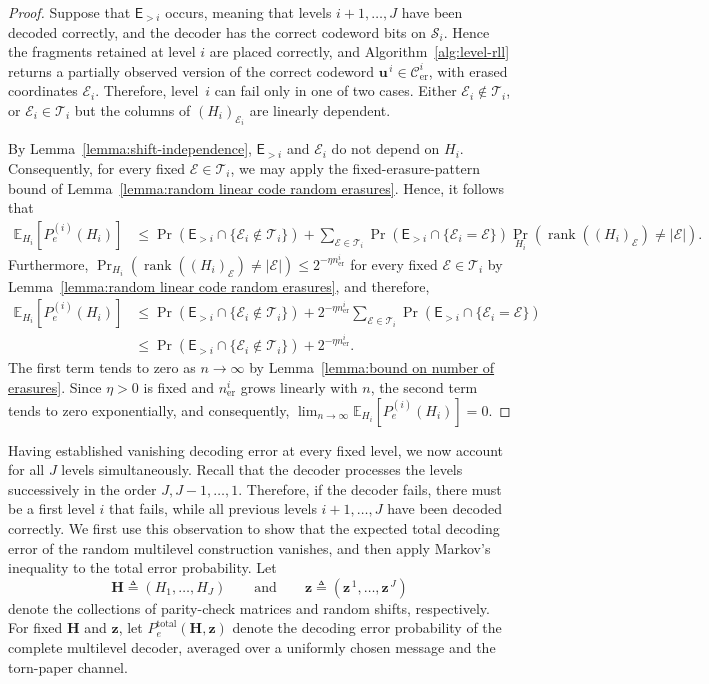 \documentclass[journal,letterpaper,onecolumn,11pt]{IEEEtran}
\newcommand{\cC}{\mathcal{C}}
\newcommand{\cE}{\mathcal{E}}
\newcommand{\cS}{\mathcal{S}}
\newcommand{\cT}{\mathcal{T}}
\newcommand{\boldu}{\mathbf{u}}
\newcommand{\boldz}{\mathbf{z}}
\newcommand{\boldH}{\mathbf{H}}
\newcommand{\rank}{\operatorname{rank}}
\begin{document}
\begin{proof}
Suppose that \(\mathsf E_{>i}\) occurs, meaning that levels
\(i+1,\ldots,J\) have been decoded correctly, and the decoder has the
correct codeword bits on \(\cS_i\). Hence the fragments retained at
level \(i\) are placed correctly, and
Algorithm~\ref{alg:level-rll} returns a partially observed version of the
correct codeword \(\boldu^{\,i}\in\cC_{\mathrm{er}}^i\), with erased
coordinates \(\cE_i\).
Therefore, level~\(i\) can fail only in one of two cases. Either
\(\cE_i\notin\cT_i\), or \(\cE_i\in\cT_i\) but the columns of
\((H_i)_{\cE_i}\) are linearly dependent.

By Lemma~\ref{lemma:shift-independence}, \(\mathsf E_{>i}\) and \(\cE_i\) do not depend on \(H_i\).
Consequently, for every fixed \(\cE\in\cT_i\), we may apply the fixed-erasure-pattern bound of
Lemma~\ref{lemma:random linear code random erasures}.
Hence, it follows that
\[
\begin{aligned}
\mathbb E_{H_i}\!\left[P_e^{(i)}(H_i)\right]
&\leq
\Pr\left(
\mathsf E_{>i}
\cap
\{\cE_i\notin\cT_i\}
\right)+
\sum_{\cE\in\cT_i}
\Pr\left(
\mathsf E_{>i}
\cap
\{\cE_i=\cE\}
\right)
\Pr_{H_i}\left(
\rank((H_i)_{\cE})\neq|\cE|
\right).
\end{aligned}
\]
Furthermore, $\Pr_{H_i}\left(
\rank((H_i)_{\cE})\neq|\cE|
\right)
\leq
2^{-\eta n_{\mathrm{er}}^i}$ for every fixed \(\cE\in\cT_i\) by Lemma~\ref{lemma:random linear code random erasures}, and therefore,
\[
\begin{aligned}
\mathbb E_{H_i}\!\left[P_e^{(i)}(H_i)\right]
&\leq
\Pr\left(
\mathsf E_{>i}
\cap
\{\cE_i\notin\cT_i\}
\right)+
2^{-\eta n_{\mathrm{er}}^i}
\sum_{\cE\in\cT_i}
\Pr\left(
\mathsf E_{>i}
\cap
\{\cE_i=\cE\}
\right)\\
&\leq
\Pr\left(
\mathsf E_{>i}
\cap
\{\cE_i\notin\cT_i\}
\right)
+
2^{-\eta n_{\mathrm{er}}^i}.
\end{aligned}
\]
The first term tends to zero as $n\to\infty$ by Lemma~\ref{lemma:bound on number of erasures}. Since \(\eta>0\) is fixed and \(n_{\mathrm{er}}^i\) grows
linearly with \(n\), the second term tends to zero exponentially, and consequently, $\lim_{n\to\infty}\mathbb E_{H_i}\!\left[P_e^{(i)}(H_i)\right]=0$.
\end{proof}
Having established vanishing decoding error at every fixed level, we
now account for all \(J\) levels simultaneously.  Recall that the decoder
processes the levels successively in the order
\(J,J-1,\ldots,1\).  Therefore, if the decoder fails, there
must be a first level \(i\) that fails, while all previous levels
\(i+1,\ldots,J\) have been decoded correctly.  We first use this
observation to show that the expected total decoding error of the random
multilevel construction vanishes, and then apply Markov's inequality to
the total error probability.
Let
\[
\boldH\triangleq(H_1,\ldots,H_J)
\qquad\text{and}\qquad
\boldz\triangleq
(\boldz^{\,1},\ldots,\boldz^{\,J})
\]
denote the collections of parity-check matrices and random shifts,
respectively.  For fixed \(\boldH\) and \(\boldz\), let
\(P_e^{\mathrm{total}}(\boldH,\boldz)\) denote the decoding error
probability of the complete multilevel decoder, averaged over a uniformly
chosen message and the torn-paper channel.
\end{document}
